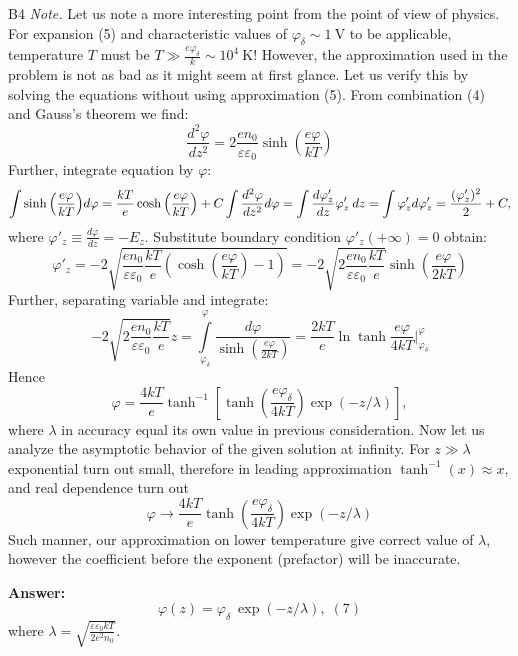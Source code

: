 \documentclass[11pt,a4paper]{article}
\begin{document}
\begin{solcard}{B4}
\textit{Note.} Let us note a more interesting point from the point of view of physics. For expansion (5) and characteristic values of $\varphi_\delta \sim 1\:  \mathrm{V}$ to be applicable, temperature $T$ must be $ T \gg \frac{e \varphi_\delta}{k} \sim 10^4\: \text{K}$! However, the approximation used in the problem is not as bad as it might seem at first glance. Let us verify this by solving the equations without using approximation (5). From combination (4) and Gauss's theorem we find: $$ \frac{d^2 \varphi}{dz^2} = 2 \frac{e n_0}{\varepsilon \varepsilon_0} \sinh{\left( \frac{e \varphi}{kT} \right)} $$ Further, integrate equation by $\varphi$: $$ \int \sinh{\left( \frac{e \varphi}{kT} \right)} d \varphi = \frac{kT}{e} \cosh{\left( \frac{e \varphi}{kT} \right)} + C \\ \int \frac{d^2 \varphi}{dz^2} d\varphi = \int \frac{d \varphi'_z}{dz} \varphi'_z \: dz = \int \varphi'_z d  \varphi'_z = \frac{ (\varphi'_z)^2}{2} + C, $$ where $\varphi'_z \equiv \frac{d \varphi}{dz} = - E_z $. Substitute boundary condition $\varphi'_z (+\infty) = 0$  obtain: $$ \varphi'_z = -2\sqrt{ \frac{e n_0}{\varepsilon \varepsilon_0} \frac{kT}{e} \left( \cosh{\left( \frac{e \varphi}{kT} \right)} -1 \right)} = -2\sqrt{2\frac{e n_0}{\varepsilon \varepsilon_0} \frac{kT}{e}} \sinh{\left( \frac{e \varphi}{2kT} \right)} $$ Further, separating variable and integrate: $$ -2\sqrt{2\frac{e n_0}{\varepsilon \varepsilon_0} \frac{kT}{e}} z = \int  \limits_{\varphi_\delta}^\varphi \frac{d \varphi}{\sinh{\left( \frac{e \varphi}{2kT} \right)}} = \frac{2kT}{e} \ln{\tanh{\frac{e \varphi}{4kT}}} \Bigg|_{\varphi_\delta}^\varphi $$ Hence $$ \varphi = \frac{4kT}{e} \tanh^{-1} \left[ \tanh{ \left( \frac{e \varphi_\delta}{4kT} \right)}{\exp \left(- z/\lambda \right)} \right], $$ where $\lambda$ in accuracy equal its own value in previous consideration. Now let us analyze the asymptotic behavior of the given solution at infinity. For $z \gg \lambda$ exponential turn out small, therefore in leading approximation $\tanh^{-1} (x) \approx x$, and real dependence turn out $$ \varphi \rightarrow  \frac{4kT}{e} \tanh{ \left( \frac{e \varphi_\delta}{4kT} \right)}{\exp \left(- z/\lambda \right)} $$ Such manner, our approximation on lower temperature give correct value of $\lambda$, however the coefficient before the exponent (prefactor) will be inaccurate.

\par\smallskip\noindent\textbf{Answer:} $$ \varphi(z) = \varphi_\delta \: \exp \left( - z/\lambda \right), \;(\text{7}) $$ where $\lambda = \sqrt{\tfrac{\varepsilon \varepsilon_0 kT}{2e^2 n_0}}$.
\end{solcard}
\end{document}
